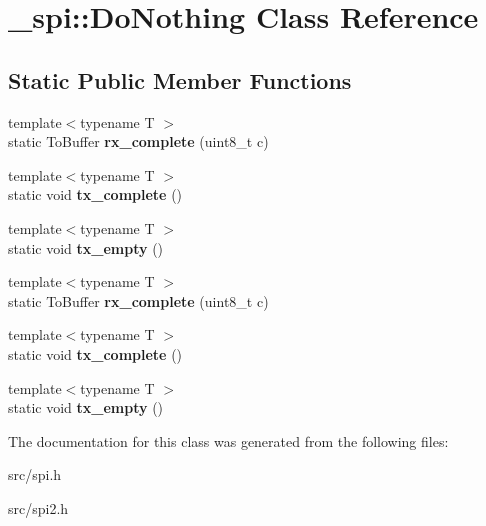 \hypertarget{class__spi_1_1DoNothing}{}\section{\+\_\+spi\+:\+:Do\+Nothing Class Reference}
\label{class__spi_1_1DoNothing}
\subsection*{Static Public Member Functions}
\begin{DoxyCompactItemize}
\item 
\hypertarget{class__spi_1_1DoNothing_a507607de4acbe431f6072a72818b2851}{}\label{class__spi_1_1DoNothing_a507607de4acbe431f6072a72818b2851} 
{\footnotesize template$<$typename T $>$ }\\static To\+Buffer {\bfseries rx\+\_\+complete} (uint8\+\_\+t c)
\item 
\hypertarget{class__spi_1_1DoNothing_a36a7cc79efa9bc687c9f8dec0f7bbc12}{}\label{class__spi_1_1DoNothing_a36a7cc79efa9bc687c9f8dec0f7bbc12} 
{\footnotesize template$<$typename T $>$ }\\static void {\bfseries tx\+\_\+complete} ()
\item 
\hypertarget{class__spi_1_1DoNothing_a385c89efefa7c63d1f172c81bc53a060}{}\label{class__spi_1_1DoNothing_a385c89efefa7c63d1f172c81bc53a060} 
{\footnotesize template$<$typename T $>$ }\\static void {\bfseries tx\+\_\+empty} ()
\item 
\hypertarget{class__spi_1_1DoNothing_a507607de4acbe431f6072a72818b2851}{}\label{class__spi_1_1DoNothing_a507607de4acbe431f6072a72818b2851} 
{\footnotesize template$<$typename T $>$ }\\static To\+Buffer {\bfseries rx\+\_\+complete} (uint8\+\_\+t c)
\item 
\hypertarget{class__spi_1_1DoNothing_a36a7cc79efa9bc687c9f8dec0f7bbc12}{}\label{class__spi_1_1DoNothing_a36a7cc79efa9bc687c9f8dec0f7bbc12} 
{\footnotesize template$<$typename T $>$ }\\static void {\bfseries tx\+\_\+complete} ()
\item 
\hypertarget{class__spi_1_1DoNothing_a385c89efefa7c63d1f172c81bc53a060}{}\label{class__spi_1_1DoNothing_a385c89efefa7c63d1f172c81bc53a060} 
{\footnotesize template$<$typename T $>$ }\\static void {\bfseries tx\+\_\+empty} ()
\end{DoxyCompactItemize}


The documentation for this class was generated from the following files\+:\begin{DoxyCompactItemize}
\item 
src/spi.\+h\item 
src/spi2.\+h\end{DoxyCompactItemize}
